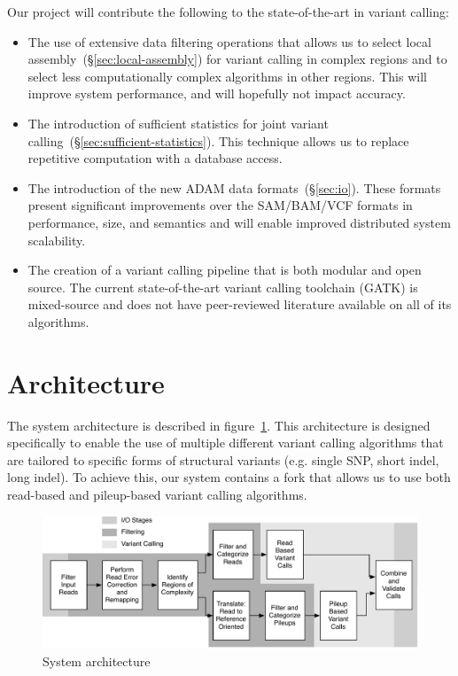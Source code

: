 \documentclass[11pt]{article}
\begin{document}
Our project will contribute the following to the state-of-the-art in variant calling:

\begin{itemize}
\item The use of extensive data filtering operations that allows us to select local assembly~(\S\ref{sec:local-assembly}) for
variant calling in complex regions and to select less computationally complex algorithms in other regions. This will improve
system performance, and will hopefully not impact accuracy.
\item The introduction of sufficient statistics for joint variant calling~(\S\ref{sec:sufficient-statistics}). This technique allows
us to replace repetitive computation with a database access.
\item The introduction of the new ADAM data formats~(\S\ref{sec:io}). These formats present significant improvements over the
SAM/BAM/VCF formats in performance, size, and semantics and will enable improved distributed system scalability.
\item The creation of a variant calling pipeline that is both modular and open source. The current state-of-the-art variant calling
toolchain (GATK) is mixed-source and does not have peer-reviewed literature available on all of its algorithms.
\end{itemize}

\section{Architecture}
\label{sec:architecture}

The system architecture is described in figure~\ref{fig:architecture}. This architecture is designed specifically to enable
the use of multiple different variant calling algorithms that are tailored to specific forms of structural variants (e.g. single
SNP, short indel, long indel). To achieve this, our system contains a fork that allows us to use both read-based and
pileup-based variant calling algorithms.

\begin{figure}[h]
\begin{center}
\includegraphics[width=0.9\linewidth]{avocado-architecture.pdf}
\end{center}
\caption{System architecture}
\label{fig:architecture}
\end{figure}
\end{document}
